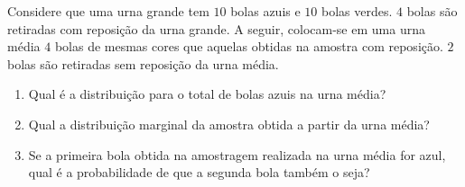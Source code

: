 \begin{exercise}
 Considere que uma urna grande tem 
 $10$ bolas azuis e $10$ bolas verdes.
 $4$ bolas são retiradas com reposição da urna grande.
 A seguir, colocam-se em uma urna média 
 $4$ bolas de mesmas cores que 
 aquelas obtidas na amostra com reposição.
 $2$ bolas são retiradas sem reposição da urna média. 
 \begin{enumerate}[label=(\alph*)]
  \item Qual é a distribuição para 
  o total de bolas azuis na urna média?
  \item Qual a distribuição marginal da
  amostra obtida a partir da urna média?
  \item Se a primeira bola obtida na 
  amostragem realizada na urna média for azul,
  qual é a probabilidade de que a segunda bola 
  também o seja?
 \end{enumerate}
\end{exercise}

